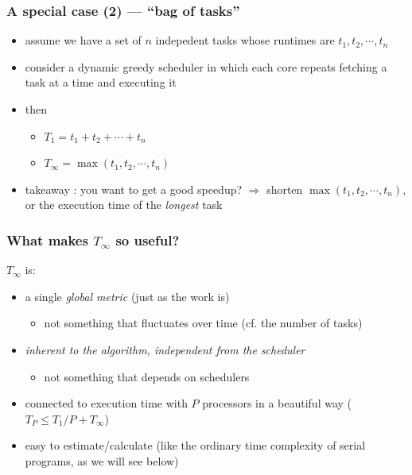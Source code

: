 \documentclass[12pt,dvipdfmx]{beamer}
\newcommand{\ao}[1]{{\color{blue}#1}}
\begin{document}
\begin{frame}
  \frametitle{A special case (2) --- ``bag of tasks''}
  \begin{itemize}
  \item assume we have a set of $n$ indepedent tasks whose runtimes are
    $t_1, t_2, \cdots , t_n$

    \begin{center}
      \def\svgwidth{0.5\columnwidth}
        
\end{center}

  \item consider a dynamic greedy scheduler in which each core repeats
    fetching a task at a time and executing it
  \item then
    \begin{itemize}
    \item $T_1 = t_1 + t_2 + \cdots + t_n$
    \item $T_\infty = \max(t_1, t_2, \cdots , t_n)$
    \end{itemize}
  \item takeaway : you want to get a good speedup? $\Rightarrow$ shorten
    $\max(t_1, t_2, \cdots , t_n)$,
    or the execution time of the \ao{\it longest} task
  \end{itemize}

\end{frame}

\begin{frame}
\frametitle{What makes $T_\infty$ so useful?}
$T_\infty$ is:
\begin{itemize}
\item a single \ao{\em global metric} (just as the work is)
  \begin{itemize}
  \item not something that fluctuates over time
    (cf. the number of tasks)
  \end{itemize}

\item \ao{\em inherent to the algorithm,
    independent from the scheduler}
  \begin{itemize}
  \item not something that depends on schedulers
  \end{itemize}

\item connected to execution time with $P$
  processors in a beautiful way (\ao{$T_P \leq T_1/P
  + T_\infty$})

\item \ao{easy to estimate/calculate}
  (like the ordinary time complexity of serial programs, as we will see below)
\end{itemize}

\end{frame}
\end{document}
